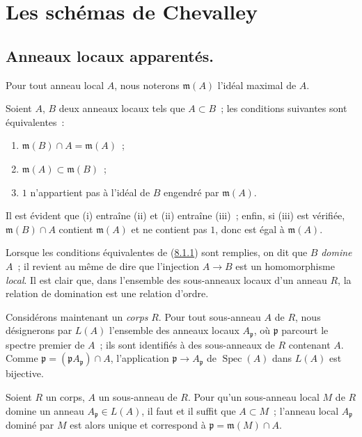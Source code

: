 \section{Les schémas de Chevalley}
\label{section:I.8-fr}

\subsection{Anneaux locaux apparentés.}
\label{subsection:I.8.1-fr}

Pour tout anneau local $A$, nous noterons $\mathfrak m(A)$ l'idéal maximal de
$A$.

\begin{lemma}[8.1.1]
\label{I.8.1.1-fr}
Soient $A$, $B$ deux anneaux locaux tels que $A\subset B$~; les conditions
suivantes sont équivalentes~:
\begin{enumerate}
  \item[\textup{(i)}] $\mathfrak m(B)\cap A=\mathfrak m(A)$~;
  \item[\textup{(ii)}] $\mathfrak m(A)\subset\mathfrak m(B)$~;
  \item[\textup{(iii)}] $1$ n'appartient pas à l'idéal de $B$ engendré par
    $\mathfrak m(A)$.
\end{enumerate}
\end{lemma}

Il est évident que (i) entraîne (ii) et (ii) entraîne (iii)~; enfin, si (iii)
est vérifiée, $\mathfrak m(B)\cap A$ contient $\mathfrak m(A)$ et ne contient
pas $1$, donc est égal à $\mathfrak m(A)$.

Lorsque les conditions équivalentes de
(\hyperref[I.8.1.1-fr]{8.1.1}) sont remplies, on dit que $B$ \emph{domine}
$A$~; il revient au même de dire que l'injection $A\to B$ est un
homomorphisme \emph{local}. Il est clair que, dans l'ensemble des sous-anneaux
locaux d'un anneau $R$, la relation de domination est une relation d'ordre.

\begin{env}[8.1.2]
\label{I.8.1.2-fr}
Considérons maintenant un \emph{corps} $R$. Pour tout sous-anneau $A$ de $R$,
nous désignerons par $L(A)$ l'ensemble des anneaux locaux $A_\mathfrak p$, où
$\mathfrak p$ parcourt le spectre premier de $A$~; ils sont identifiés à des
sous-anneaux de $R$ contenant $A$. Comme
$\mathfrak p=(\mathfrak p A_\mathfrak p)\cap A$, l'application
$\mathfrak p\to A_\mathfrak p$ de $\operatorname{Spec}(A)$ dans $L(A)$
est bijective.
\end{env}

\begin{lemma}[8.1.3]
\label{I.8.1.3-fr}
Soient $R$ un corps, $A$ un sous-anneau de $R$. Pour qu'un sous-anneau local
$M$ de $R$ domine un anneau $A_\mathfrak p\in L(A)$, il faut et il suffit que
$A\subset M$~; l'anneau local $A_\mathfrak p$ dominé par $M$ est alors unique
et correspond à $\mathfrak p=\mathfrak m(M)\cap A$.
\end{lemma}

